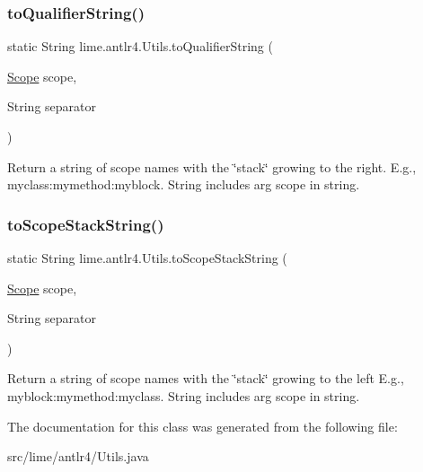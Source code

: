 \subsubsection{\texorpdfstring{to\+Qualifier\+String()}{toQualifierString()}}
{\footnotesize\ttfamily static String lime.\+antlr4.\+Utils.\+to\+Qualifier\+String (\begin{DoxyParamCaption}\item[{\hyperlink{interfacelime_1_1antlr4_1_1Scope}{Scope}}]{scope,  }\item[{String}]{separator }\end{DoxyParamCaption})\hspace{0.3cm}{\ttfamily [static]}}

Return a string of scope names with the \char`\"{}stack\char`\"{} growing to the right. E.\+g., myclass\+:mymethod\+:myblock. String includes arg scope in string. \mbox{\label{classlime_1_1antlr4_1_1Utils_a978f0238c4f1d5992ab04c7533cb17c3}} 
\subsubsection{\texorpdfstring{to\+Scope\+Stack\+String()}{toScopeStackString()}}
{\footnotesize\ttfamily static String lime.\+antlr4.\+Utils.\+to\+Scope\+Stack\+String (\begin{DoxyParamCaption}\item[{\hyperlink{interfacelime_1_1antlr4_1_1Scope}{Scope}}]{scope,  }\item[{String}]{separator }\end{DoxyParamCaption})\hspace{0.3cm}{\ttfamily [static]}}

Return a string of scope names with the \char`\"{}stack\char`\"{} growing to the left E.\+g., myblock\+:mymethod\+:myclass. String includes arg scope in string. 

The documentation for this class was generated from the following file\+:\begin{DoxyCompactItemize}
\item 
src/lime/antlr4/Utils.\+java\end{DoxyCompactItemize}

